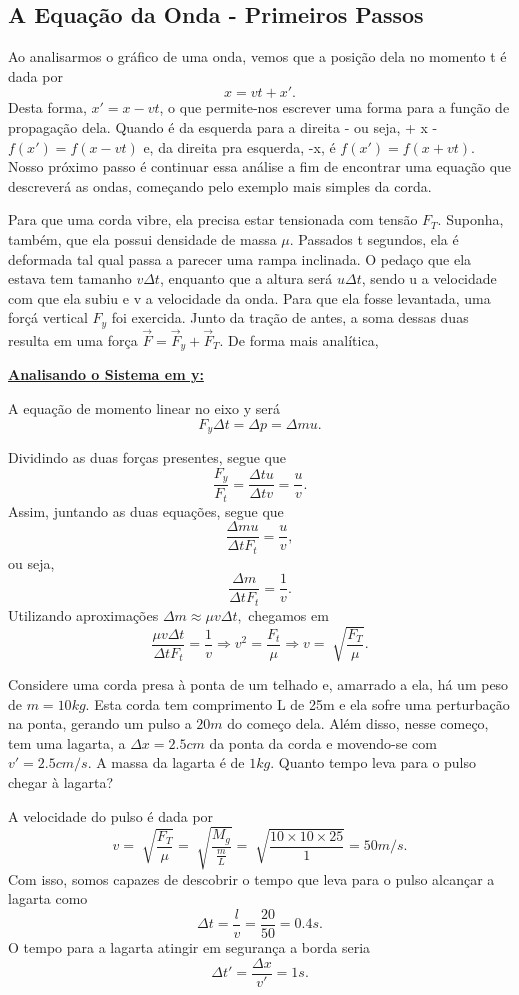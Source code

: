 \documentclass[physicsII_notes.tex]{subfiles}
\begin{document}
\subsection{A Equação da Onda - Primeiros Passos}
Ao analisarmos o gráfico de uma onda, vemos que a posição dela no momento t é dada por
\[
	x = vt + x'.
\]
Desta forma, \(x' = x - vt\), o que permite-nos escrever uma forma para a função de propagação dela. Quando
é da esquerda para a direita - ou seja, + x - \(f(x') = f(x-vt)\) e, da direita pra esquerda, -x, é \(f(x') = f(x+vt)\).
Nosso próximo passo é continuar essa análise a fim de encontrar uma equação que descreverá as ondas, começando pelo exemplo
mais simples da corda.

Para que uma corda vibre, ela precisa estar tensionada com tensão \(F_{T}\). Suponha, também, que ela possui densidade de massa \(\mu\).
Passados t segundos, ela é deformada tal qual passa a parecer uma rampa inclinada. O pedaço que ela estava tem tamanho
\(v\Delta t\), enquanto que a altura será \(u\Delta t\), sendo u a velocidade com que ela subiu e v a velocidade da onda.
Para que ela fosse levantada, uma forçá vertical \(F_{y}\) foi exercida. Junto da tração de antes, a soma dessas duas resulta em uma
força \(\vec{F} = \vec{F}_{y} + \vec{F}_{T}.\) De forma mais analítica,

\underline{\textbf{Analisando o Sistema em y:}}

A equação de momento linear no eixo y será
\[
	F_{y}\Delta t = \Delta p = \Delta mu.
\]

Dividindo as duas forças presentes, segue que
\[
	\frac{F_{y}}{F_{t}} = \frac{\Delta tu}{\Delta tv} = \frac{u}{v}.
\]
Assim, juntando as duas equações, segue que
\[
	\frac{\Delta m u}{\Delta t F_{t}} = \frac{u}{v},
\]
ou seja,
\[
	\frac{\Delta m}{\Delta t F_{t}} = \frac{1}{v}.
\]
Utilizando aproximações \(\Delta m\approx \mu v\Delta t,\) chegamos em
\[
	\frac{\mu v\Delta t}{\Delta t F_{t}} = \frac{1}{v} \Rightarrow v^{2}=\frac{F_{t}}{\mu} \Rightarrow v = \sqrt[]{\frac{F_{T}}{\mu}}.
\]
\begin{example}
	Considere uma corda presa à ponta de um telhado e, amarrado a ela, há um peso de \(m=10kg\). Esta corda
	tem comprimento L de 25m e ela sofre uma perturbação na ponta, gerando um pulso a \(20m \) do começo dela. Além disso,
	nesse começo, tem uma lagarta, a \(\Delta x = 2.5cm\) da ponta da corda e movendo-se com \(v'=2.5cm/s\). A massa da
	lagarta é de \(1kg\). Quanto tempo leva para o pulso chegar à lagarta?

	A velocidade do pulso é dada por
	\[
		v = \sqrt[]{\frac{F_{T}}{\mu}}=\sqrt[]{\frac{M_{g}}{\frac{m}{L}}} = \sqrt[]{\frac{10\times 10\times 25}{1}}=50m/s.
	\]
	Com isso, somos capazes de descobrir o tempo que leva para o pulso alcançar a lagarta como
	\[
		\Delta t = \frac{l}{v} = \frac{20}{50} = 0.4s.
	\]
	O tempo para a lagarta atingir em segurança a borda seria
	\[
		\Delta t' = \frac{\Delta x}{v'} = 1s.
	\]
\end{example}
\end{document}
